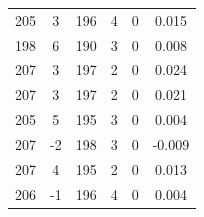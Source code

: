 \documentclass[a4paper, 12pt]{article}
\begin{document}
\begin{table}[H]
\begin{tabular}{@{}cccccc@{}}
    205                   & 3                     & 196               & 4                 & 0                 & 0.015               \\
    198                   & 6                     & 190               & 3                 & 0                 & 0.008               \\
    207                   & 3                     & 197               & 2                 & 0                 & 0.024               \\
    207                   & 3                     & 197               & 2                 & 0                 & 0.021               \\
    205                   & 5                     & 195               & 3                 & 0                 & 0.004               \\
    207                   & -2                    & 198               & 3                 & 0                 & -0.009              \\
    207                   & 4                     & 195               & 2                 & 0                 & 0.013               \\
    206                   & -1                    & 196               & 4                 & 0                 & 0.004               \\ \bottomrule
    \end{tabular}
    \end{table} 
\end{document}
